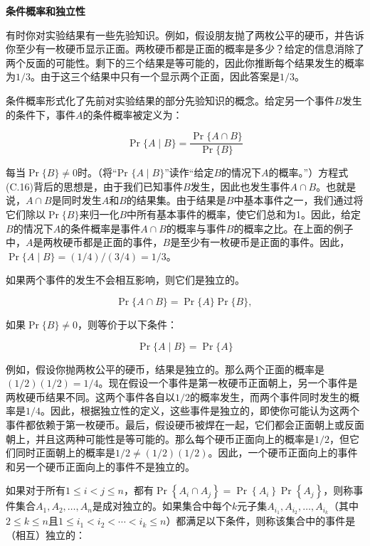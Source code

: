\documentclass[lang=cn,newtx,10pt,scheme=chinese]{elegantbook}
\begin{document}
\textbf{条件概率和独立性}

有时你对实验结果有一些先验知识。例如，假设朋友抛了两枚公平的硬币，并告诉你至少有一枚硬币显示正面。两枚硬币都是正面的概率是多少？给定的信息消除了两个反面的可能性。剩下的三个结果是等可能的，因此你推断每个结果发生的概率为$1/3$。由于这三个结果中只有一个显示两个正面，因此答案是$1/3$。

条件概率形式化了先前对实验结果的部分先验知识的概念。给定另一个事件$B$发生的条件下，事件$A$的条件概率被定义为：

$$
\operatorname{Pr}\{A \mid B\}=\frac{\operatorname{Pr}\{A \cap B\}}{\operatorname{Pr}\{B\}}
$$

每当$\operatorname{Pr}\{B\} \neq 0$时。（将“Pr $\{A \mid B\}$”读作“给定$B$的情况下$A$的概率。”）方程式(C.16)背后的思想是，由于我们已知事件$B$发生，因此也发生事件$A \cap B$。也就是说，$A \cap B$是同时发生$A$和$B$的结果集。由于结果是$B$中基本事件之一，我们通过将它们除以$\operatorname{Pr}\{B\}$来归一化$B$中所有基本事件的概率，使它们总和为1。因此，给定$B$的情况下$A$的条件概率是事件$A \cap B$的概率与事件$B$的概率之比。在上面的例子中，$A$是两枚硬币都是正面的事件，$B$是至少有一枚硬币是正面的事件。因此，$\operatorname{Pr}\{A \mid B\}=(1 / 4) /(3 / 4)=1 / 3$。

如果两个事件的发生不会相互影响，则它们是独立的。

$$
\operatorname{Pr}\{A \cap B\}=\operatorname{Pr}\{A\} \operatorname{Pr}\{B\} \text {, }
$$

如果$\operatorname{Pr}\{B\} \neq 0$，则等价于以下条件：

$$
\operatorname{Pr}\{A \mid B\}=\operatorname{Pr}\{A\}
$$

例如，假设你抛两枚公平的硬币，结果是独立的。那么两个正面的概率是$(1 / 2)(1 / 2)=1 / 4$。现在假设一个事件是第一枚硬币正面朝上，另一个事件是两枚硬币结果不同。这两个事件各自以$1/2$的概率发生，而两个事件同时发生的概率是$1/4$。因此，根据独立性的定义，这些事件是独立的，即使你可能认为这两个事件都依赖于第一枚硬币。最后，假设硬币被焊在一起，它们都会正面朝上或反面朝上，并且这两种可能性是等可能的。那么每个硬币正面向上的概率是$1/2$，但它们同时正面朝上的概率是$1/2 \neq(1 / 2)(1 / 2)$。因此，一个硬币正面向上的事件和另一个硬币正面向上的事件不是独立的。

如果对于所有$1 \leq i<j \leq n$，都有$\operatorname{Pr}\left\{A_i \cap A_j\right\}=\operatorname{Pr}\left\{A_i\right\} \operatorname{Pr}\left\{A_j\right\}$，则称事件集合$A_1, A_2, \ldots, A_n$是成对独立的。如果集合中每个$k$元子集$A_{i_1}, A_{i_2}, \ldots, A_{i_k}$（其中$2 \leq k \leq n$且$1 \leq i_1<i_2<\cdots<i_k \leq n$）都满足以下条件，则称该集合中的事件是（相互）独立的：
\end{document}
